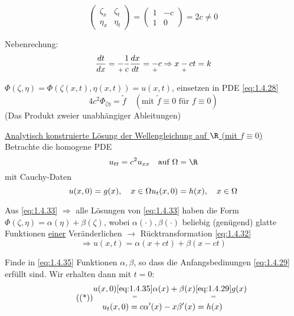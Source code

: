 \[
    \begin{pmatrix}
        \zeta_x & \zeta_t\\
        \eta_x & \eta_t
    \end{pmatrix}
    =
    \begin{pmatrix}
        1 & -c\\
        1 & 0
    \end{pmatrix}
    = 2c \neq 0
\]

Nebenrechung: \[
    \frac{dt}{dx} = \underset{+}{-} \frac{1}{c}\\
    \frac{dx}{dt} = \underset{+}{-} c\\
    \Rightarrow x \underset{+}{-}ct = k
\]

$\Phi(\zeta,\eta) = \Phi(\zeta(x,t),\eta(x,t)) = u(x,t)$, einsetzen in PDE \eqref{eq:1.4.28} 
\begin{equation}%
    4c^2\Phi_{\zeta\eta} = \tilde{f} \quad (\text{mit } \tilde{f}\equiv 0 \text{ für } f\equiv 0)
    \label{}
\end{equation}
(Das Produkt zweier unabhängiger Ableitungen)

\underline{Analytisch konstruierte Lösung der Wellengleichung auf $\R$ (mit $f\equiv 0$)}\\
Betrachte die homogene PDE
\begin{equation}
    u_{tt} = c^2u_{xx} \quad \text{auf } \Omega=\R
    \label{}
\end{equation}
mit Cauchy-Daten
\[
    u(x,0) = g(x), \quad x\in\Omega\\
    u_t(x,0)=h(x),\quad x\in\Omega
\]

Aus \eqref{eq:1.4.33} $\Rightarrow$ alle Lösungen von \eqref{eq:1.4.33} haben die Form $\Phi(\zeta,\eta) = \alpha(\eta) + \beta(\zeta)$, wobei $\alpha(\cdot), \beta(\cdot)$ beliebig (genügend) glatte Funktionen \underline{einer} Veränderlichen $\rightarrow$ Rücktransformation \eqref{eq:1.4.32}
\begin{equation}
    \Rightarrow u(x,t) = \alpha(x+ct) + \beta(x-ct)
    \label{}
\end{equation}

Finde in \eqref{eq:1.4.35} Funktionen $\alpha,\beta$, so dass die Anfangsbedinungen \eqref{eq:1.4.29} erfüllt sind. Wir erhalten dann mit $t=0$:
\begin{equation}
    \tag{(*)}
    \begin{aligned}
        u(x,0) \underset{=}{\eqref{eq:1.4.35}} \alpha(x) + \beta(x) &\underset{=}{\eqref{eq:1.4.29}} g(x)\\
        u_t(x,0) = c\alpha'(x)-x\beta'(x) &= h(x)
    \end{aligned}
\end{equation}

